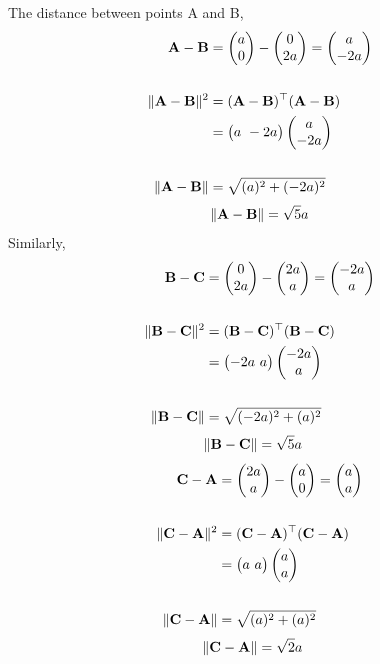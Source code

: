 \documentclass[journal,12pt,twocolumn]{IEEEtran}
\begin{document}
The distance between points A and B,
\vspace{0.3cm}
\begin{align*}
\mathbf{A} - \mathbf{B}&=\begin{pmatrix}a\\0\end{pmatrix}-\begin{pmatrix}0\\2a\end{pmatrix}=\begin{pmatrix}a\\-2a\end{pmatrix}\\\\
\lVert\mathbf{A}-\mathbf{B}\rVert^2 &=({\mathbf{A}-\mathbf{B}})^\top({\mathbf{A}-\mathbf{B}})\\
&= \begin{pmatrix}a \ -2a\end{pmatrix} \begin{pmatrix}a\\-2a\end{pmatrix}\\\\
\lVert\mathbf{A}-\mathbf{B}\rVert&=\sqrt{(a)^2+(-2a)^2}
\end{align*}
\begin{align}
 \lVert \mathbf{A}-\mathbf{B}\rVert=\sqrt{5}a   \label{Eq:1}
\end{align}
Similarly, 
\begin{align*}
\mathbf{B} - \mathbf{C}&=\begin{pmatrix}0\\2a\end{pmatrix}-\begin{pmatrix}2a\\a\end{pmatrix}=\begin{pmatrix}-2a\\a\end{pmatrix}\\\\
\lVert\mathbf{B}-\mathbf{C}\rVert^2&=({\mathbf{B}-\mathbf{C}})^\top({\mathbf{B}-\mathbf{C}})\\&= \begin{pmatrix}-2a \ a\end{pmatrix} \begin{pmatrix}-2a\\a\end{pmatrix}\\\\
\lVert\mathbf{B}-\mathbf{C}\rVert&=\sqrt{(-2a)^2+(a)^2}
\end{align*}
\begin{align}
    \lVert \mathbf{B} - \mathbf{C}\rVert&=\sqrt{5}a \label{Eq:2}
\end{align}
\begin{align*}
\mathbf{C} - \mathbf{A}&=\begin{pmatrix}2a\\a\end{pmatrix}-\begin{pmatrix}a\\0\end{pmatrix}=\begin{pmatrix}a\\a\end{pmatrix}\\\\
\lVert\mathbf{C}-\mathbf{A}\rVert^2&=({\mathbf{C}-\mathbf{A}})^\top({\mathbf{C}-\mathbf{A}})\\&= \begin{pmatrix}a \ a\end{pmatrix} \begin{pmatrix}a\\a\end{pmatrix}\\\\
\lVert\mathbf{C}-\mathbf{A}\rVert&=\sqrt{(a)^2+(a)^2}
\end{align*}
\begin{align}
\lVert \mathbf{C} - \mathbf{A}\rVert&=\sqrt{2}a     \label{Eq:3}
\end{align}
\end{document}
